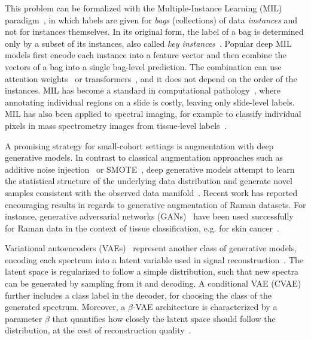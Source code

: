 \documentclass[12pt]{article}
\theoremstyle{paper}
\begin{document}
This problem can be formalized with the Multiple-Instance Learning (MIL) paradigm~\cite{dietterich1997solving}, in which labels are given for \emph{bags} (collections) of data \emph{instances} and not for instances themselves. In its original form, the label of a bag is determined only by a subset of its instances, also called \emph{key instances}~\cite{liu2012key}. Popular deep MIL models first encode each instance into a feature vector and then combine the vectors of a bag into a single bag-level prediction. The combination can use attention weights~\cite{ilse2018attention,lu2021data} or transformers~\cite{shao2021transmil}, and it does not depend on the order of the instances. MIL has become a standard in computational pathology~\cite{waqas2024exploring,gadermayr2024multiple}, where annotating individual regions on a slide is costly, leaving only slide-level labels. MIL has also been applied to spectral imaging, for example to classify individual pixels in mass spectrometry images from tissue-level labels~\cite{guo2020deep}.

A promising strategy for small-cohort settings is augmentation with deep generative models. In contrast to classical augmentation approaches such as additive noise injection~\cite{zhou2022deeply} or SMOTE~\cite{chawla2002smote, song2022rapid}, deep generative models attempt to learn the statistical structure of the underlying data distribution and generate novel samples consistent with the observed data manifold~\cite{jordon2022synthetic}. Recent work has reported encouraging results in regards to generative augmentation of Raman datasets. For instance, generative adversarial networks (GANs)~\cite{goodfellow2020generative} have been used successfully for Raman data in the context of tissue classification, e.g. for skin cancer~\cite{wu2021raman, zhao2024raman}.

Variational autoencoders (VAEs)~\cite{kingma2013auto} represent another class of generative models, encoding each spectrum into a latent variable used in signal reconstruction~\cite{flanagan2025exploring}. The latent space is regularized to follow a simple distribution, such that new spectra can be generated by sampling from it and decoding. A conditional VAE (CVAE)~\cite{sohn2015learning} further includes a class label in the decoder, for choosing the class of the generated spectrum. Moreover, a $\beta$-VAE architecture is characterized by a parameter $\beta$ that quantifies how closely the latent space should follow the distribution, at the cost of reconstruction quality~\cite{higgins2017betavae}.
\end{document}
